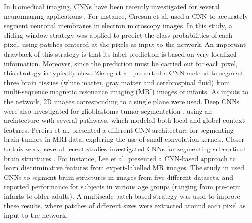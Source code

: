 \documentclass[twoside,fleqn,espcrc2]{elsarticle}
\begin{document}
In biomedical imaging, CNNs have been recently investigated for several neuroimaging applications \cite{ciresan2012deep,zhang2015deep,havaei2016brain,pereira2016brain}. For instance, Ciresan et al. \cite{ciresan2012deep} used a CNN to accurately segment neuronal membranes in electron microscopy images. In this study, a sliding-window strategy was applied to predict the class probabilities of each pixel, using patches centered at the pixels as input to the network. An important drawback of this strategy is that its label prediction is based on very localized information. Moreover, since the prediction must be carried out for each pixel, this strategy is typically slow. %
Zhang et al. \cite{zhang2015deep} presented a CNN method to segment three brain tissues (white matter, gray matter and cerebrospinal fluid) from multi-sequence magnetic resonance imaging (MRI) images of infants. As inputs to the network, 2D images corresponding to a single plane were used. Deep CNNs were also investigated for glioblastoma tumor segmentation \cite{havaei2016brain}, using an architecture with several pathways, which modeled both local and global-context features. Pereira et al. \cite{pereira2016brain} presented a different CNN architecture for segmenting brain tumors in MRI data, exploring the use of small convolution kernels. Closer to this work, several recent studies investigated CNNs for segmenting subcortical brain structures \cite{shakeri2016sub,lee2011towards,moeskops2016automatic,milletari2016hough,Brebisson2015deep}. For instance, Lee et al. \cite{lee2011towards} presented a CNN-based approach to learn discriminative features from expert-labelled MR images. The study in \cite{moeskops2016automatic} used CNNs to segment brain structures in images from five different datasets, and reported performance for subjects in various age groups (ranging from pre-term infants to older adults). A multiscale patch-based strategy was used to improve these results, where patches of different sizes were extracted around each pixel as input to the network. 
\end{document}
